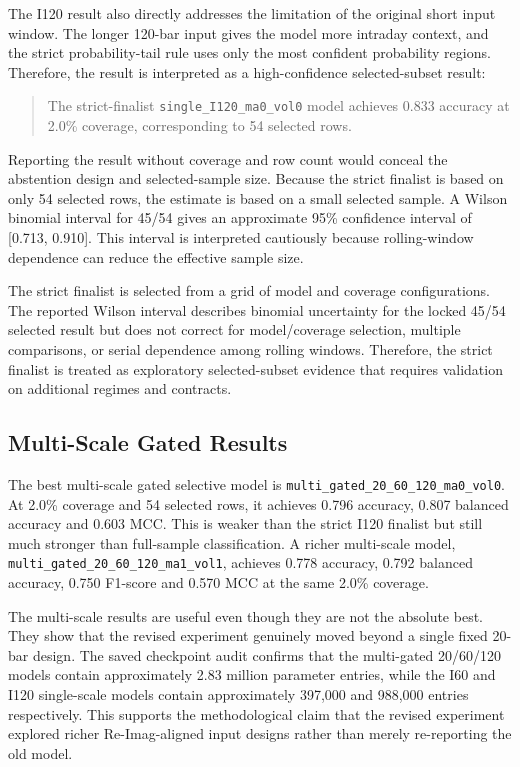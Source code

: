The I120 result also directly addresses the limitation of the original short input window. The longer 120-bar input gives the model more intraday context, and the strict probability-tail rule uses only the most confident probability regions. Therefore, the result is interpreted as a high-confidence selected-subset result:

\begin{quote}
The strict-finalist \texttt{single\_I120\_ma0\_vol0} model achieves 0.833 accuracy at 2.0\% coverage, corresponding to 54 selected rows.
\end{quote}

Reporting the result without coverage and row count would conceal the abstention design and selected-sample size. Because the strict finalist is based on only 54 selected rows, the estimate is based on a small selected sample. A Wilson binomial interval for 45/54 gives an approximate 95\% confidence interval of [0.713, 0.910]. This interval is interpreted cautiously because rolling-window dependence can reduce the effective sample size.

The strict finalist is selected from a grid of model and coverage configurations. The reported Wilson interval describes binomial uncertainty for the locked 45/54 selected result but does not correct for model/coverage selection, multiple comparisons, or serial dependence among rolling windows. Therefore, the strict finalist is treated as exploratory selected-subset evidence that requires validation on additional regimes and contracts.

\subsection{Multi-Scale Gated Results}
\label{subsec:multiscale_results}

The best multi-scale gated selective model is \texttt{multi\_gated\_20\_60\_120\_ma0\_vol0}. At 2.0\% coverage and 54 selected rows, it achieves 0.796 accuracy, 0.807 balanced accuracy and 0.603 MCC. This is weaker than the strict I120 finalist but still much stronger than full-sample classification. A richer multi-scale model, \texttt{multi\_gated\_20\_60\_120\_ma1\_vol1}, achieves 0.778 accuracy, 0.792 balanced accuracy, 0.750 F1-score and 0.570 MCC at the same 2.0\% coverage.

The multi-scale results are useful even though they are not the absolute best. They show that the revised experiment genuinely moved beyond a single fixed 20-bar design. The saved checkpoint audit confirms that the multi-gated 20/60/120 models contain approximately 2.83 million parameter entries, while the I60 and I120 single-scale models contain approximately 397,000 and 988,000 entries respectively. This supports the methodological claim that the revised experiment explored richer Re-Imag-aligned input designs rather than merely re-reporting the old model.

